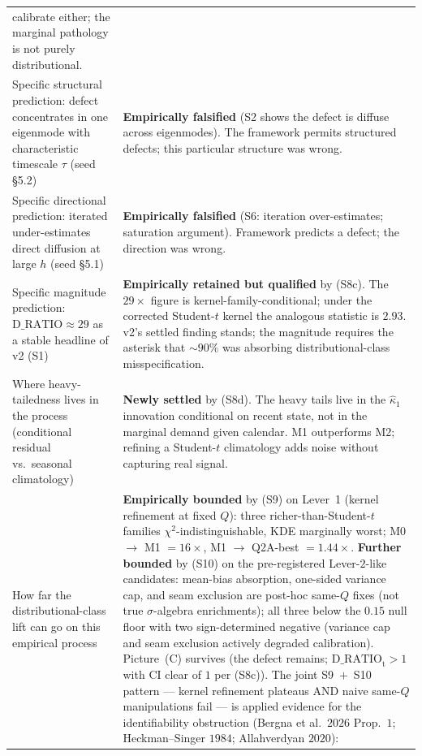 \documentclass[11pt]{article}
\newcommand{\Studt}{\mathrm{t}}
\theoremstyle{definition}
\theoremstyle{plain}
\begin{document}
\begin{longtable}{P{0.40\textwidth}P{0.55\textwidth}}
calibrate either; the marginal pathology is not purely distributional. \\
\addlinespace
Specific structural prediction: defect concentrates in one
eigenmode with characteristic timescale $\tau$ (seed \S5.2)
& \textbf{Empirically falsified} (S2 shows the defect is diffuse
across eigenmodes). The framework permits structured defects;
this particular structure was wrong. \\
\addlinespace
Specific directional prediction: iterated under-estimates direct
diffusion at large $h$ (seed \S5.1)
& \textbf{Empirically falsified} (S6: iteration over-estimates;
saturation argument). Framework predicts a defect; the direction
was wrong. \\
\addlinespace
Specific magnitude prediction: $\mathrm{D\_RATIO} \approx 29$
as a stable headline of v2 (S1)
& \textbf{Empirically retained but qualified} by (S8c). The
$29\times$ figure is kernel-family-conditional; under the
corrected Student-$t$ kernel the analogous statistic is
$2.93$. v2's settled finding stands; the magnitude requires the
asterisk that $\sim 90\%$ was absorbing distributional-class
misspecification. \\
\addlinespace
Where heavy-tailedness lives in the process
(conditional residual vs.\ seasonal climatology)
& \textbf{Newly settled} by (S8d). The heavy tails live in the
$\hat\kappa_1$ innovation conditional on recent state, not in the
marginal demand given calendar. M1 outperforms M2; refining a
Student-$t$ climatology adds noise without capturing real signal. \\
\addlinespace
How far the distributional-class lift can go on this empirical
process
& \textbf{Empirically bounded} by (S9) on Lever~1 (kernel
refinement at fixed $Q$): three richer-than-Student-$t$ families
$\chi^{2}$-indistinguishable, KDE marginally worst; M0 $\to$ M1
$= 16\times$, M1 $\to$ Q2A-best $= 1.44\times$. \textbf{Further
bounded} by (S10) on the pre-registered Lever-$2$-like candidates:
mean-bias absorption, one-sided variance cap, and seam exclusion
are post-hoc same-$Q$ fixes (not true $\sigma$-algebra
enrichments); all three below the $0.15$ null floor with two
sign-determined negative (variance cap and seam exclusion
actively degraded calibration). Picture~(C) survives (the defect
remains; $\mathrm{D\_RATIO}_{\Studt} > 1$ with CI clear of $1$
per (S8c)). The joint S9~$+$~S10 pattern --- kernel refinement
plateaus AND naive same-$Q$ manipulations fail --- is applied
evidence for the identifiability obstruction (Bergna et al.\
$2026$ Prop.\ $1$; Heckman--Singer $1984$; Allahverdyan $2020$):

\end{longtable}
\end{document}
